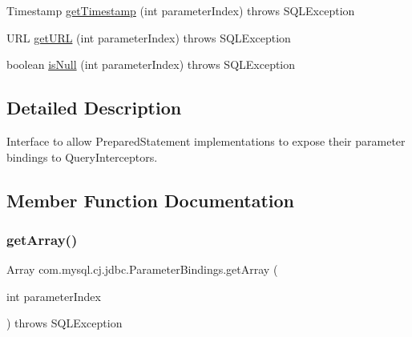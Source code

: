 \begin{DoxyCompactItemize}
\item 
Timestamp \mbox{\hyperlink{interfacecom_1_1mysql_1_1cj_1_1jdbc_1_1_parameter_bindings_abb261478b55064db1938f837095feca7}{get\+Timestamp}} (int parameter\+Index)  throws S\+Q\+L\+Exception
\item 
U\+RL \mbox{\hyperlink{interfacecom_1_1mysql_1_1cj_1_1jdbc_1_1_parameter_bindings_af28f57a78ba506316209ee5a758b2bfe}{get\+U\+RL}} (int parameter\+Index)  throws S\+Q\+L\+Exception
\item 
boolean \mbox{\hyperlink{interfacecom_1_1mysql_1_1cj_1_1jdbc_1_1_parameter_bindings_a0b42ffb9b34b6391e72fb8a67630f7f1}{is\+Null}} (int parameter\+Index)  throws S\+Q\+L\+Exception
\end{DoxyCompactItemize}


\subsection{Detailed Description}
Interface to allow Prepared\+Statement implementations to expose their parameter bindings to Query\+Interceptors. 

\subsection{Member Function Documentation}
\mbox{\label{interfacecom_1_1mysql_1_1cj_1_1jdbc_1_1_parameter_bindings_aef9b2cf9ed976523c1ffcb9356f7b572}} 
\subsubsection{\texorpdfstring{get\+Array()}{getArray()}}
{\footnotesize\ttfamily Array com.\+mysql.\+cj.\+jdbc.\+Parameter\+Bindings.\+get\+Array (\begin{DoxyParamCaption}\item[{int}]{parameter\+Index }\end{DoxyParamCaption}) throws S\+Q\+L\+Exception}

\mbox{\label{interfacecom_1_1mysql_1_1cj_1_1jdbc_1_1_parameter_bindings_aef04186958c6a6067af23f85e11ded42}} 
